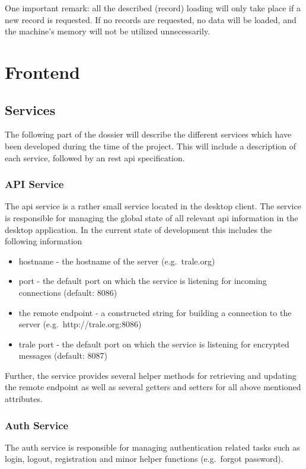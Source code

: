 One important remark: all the described (record) loading will only take place if a new record is requested.
If no records are requested, no data will be loaded, and the machine's memory will not be utilized unnecessarily.

\section{Frontend}\label{sec:frontend}

\subsection{Services}\label{subsec:services}

The following part of the dossier will describe the different services which have been developed during the time of the project.
This will include a description of each service, followed by an \ac{rest} \ac{api} specification.

\subsubsection{API Service}\label{subsubsec:api-service}

The \ac{api} service is a rather small service located in the desktop client.
The service is responsible for managing the global state of all relevant \ac{api} information in the desktop application.
In the current state of development this includes the following information

\begin{itemize}\setlength\itemsep{-0.5em}
    \item hostname - the hostname of the server (e.g.\ trale.org)
    \item port - the default port on which the service is listening for incoming connections (default: 8086)
    \item the remote endpoint - a constructed string for building a connection to the server (e.g.\ http://trale.org:8086)
    \item trale port - the default port on which the service is listening for encrypted messages (default: 8087)
\end{itemize}

Further, the service provides several helper methods for retrieving and updating the remote endpoint as well as several
getters and setters for all above mentioned attributes.

\subsubsection{Auth Service}\label{subsubsec:auth-service}
The auth service is responsible for managing authentication related tasks such as login, logout, registration and
minor helper functions (e.g.\ forgot password).

